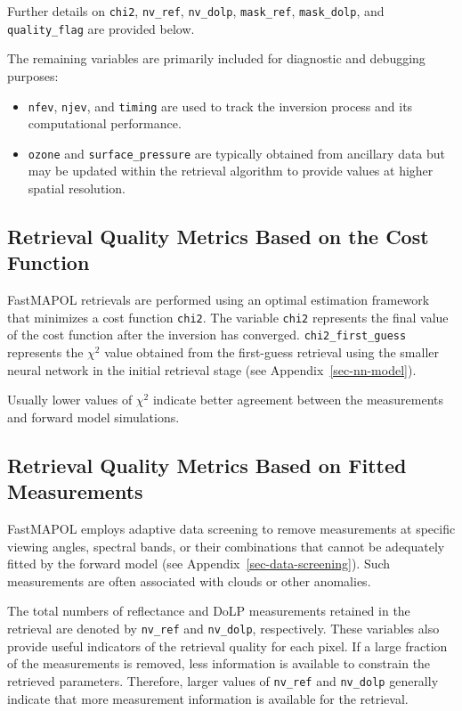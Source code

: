 \documentclass[
  11pt,
  letterpaper,
]{scrreprt}
\begin{document}
Further details on \texttt{chi2}, \texttt{nv\_ref}, \texttt{nv\_dolp},
\texttt{mask\_ref}, \texttt{mask\_dolp}, and \texttt{quality\_flag} are
provided below.

The remaining variables are primarily included for diagnostic and
debugging purposes:

\begin{itemize}
\item
  \texttt{nfev}, \texttt{njev}, and \texttt{timing} are used to track
  the inversion process and its computational performance.
\item
  \texttt{ozone} and \texttt{surface\_pressure} are typically obtained
  from ancillary data but may be updated within the retrieval algorithm
  to provide values at higher spatial resolution.
\end{itemize}

\subsection{Retrieval Quality Metrics Based on the Cost
Function}\label{retrieval-quality-metrics-based-on-the-cost-function}

FastMAPOL retrievals are performed using an optimal estimation framework
that minimizes a cost function \texttt{chi2}. The variable \texttt{chi2}
represents the final value of the cost function after the inversion has
converged. \texttt{chi2\_first\_guess} represents the \(\chi^2\) value
obtained from the first-guess retrieval using the smaller neural network
in the initial retrieval stage (see Appendix~\ref{sec-nn-model}).

Usually lower values of \(\chi^2\) indicate better agreement between the
measurements and forward model simulations.

\subsection{Retrieval Quality Metrics Based on Fitted
Measurements}\label{retrieval-quality-metrics-based-on-fitted-measurements}

FastMAPOL employs adaptive data screening to remove measurements at
specific viewing angles, spectral bands, or their combinations that
cannot be adequately fitted by the forward model (see
Appendix~\ref{sec-data-screening}). Such measurements are often
associated with clouds or other anomalies.

The total numbers of reflectance and DoLP measurements retained in the
retrieval are denoted by \texttt{nv\_ref} and \texttt{nv\_dolp},
respectively. These variables also provide useful indicators of the
retrieval quality for each pixel. If a large fraction of the
measurements is removed, less information is available to constrain the
retrieved parameters. Therefore, larger values of \texttt{nv\_ref} and
\texttt{nv\_dolp} generally indicate that more measurement information
is available for the retrieval.
\end{document}
